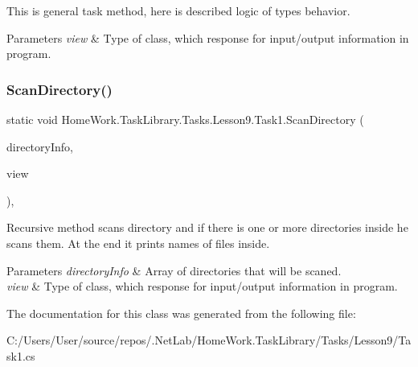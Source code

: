 This is general task method, here is described logic of types behavior. 


\begin{DoxyParams}{Parameters}
{\em view} & Type of class, which response for input/output information in program.\\
\hline
\end{DoxyParams}
\mbox{\label{class_home_work_1_1_task_library_1_1_tasks_1_1_lesson9_1_1_task1_afc82c594307b1f65309401a397d1ec1f}} 
\subsubsection{\texorpdfstring{ScanDirectory()}{ScanDirectory()}}
{\footnotesize\ttfamily static void Home\+Work.\+Task\+Library.\+Tasks.\+Lesson9.\+Task1.\+Scan\+Directory (\begin{DoxyParamCaption}\item[{Directory\+Info \mbox{[}$\,$\mbox{]}}]{directory\+Info,  }\item[{I\+Information}]{view }\end{DoxyParamCaption})\hspace{0.3cm}{\ttfamily [static]}, {\ttfamily [private]}}



Recursive method scans directory and if there is one or more directories inside he scans them. At the end it prints names of files inside. 


\begin{DoxyParams}{Parameters}
{\em directory\+Info} & Array of directories that will be scaned.\\
\hline
{\em view} & Type of class, which response for input/output information in program.\\
\hline
\end{DoxyParams}


The documentation for this class was generated from the following file\+:\begin{DoxyCompactItemize}
\item 
C\+:/\+Users/\+User/source/repos/.\+Net\+Lab/\+Home\+Work.\+Task\+Library/\+Tasks/\+Lesson9/Task1.\+cs\end{DoxyCompactItemize}
